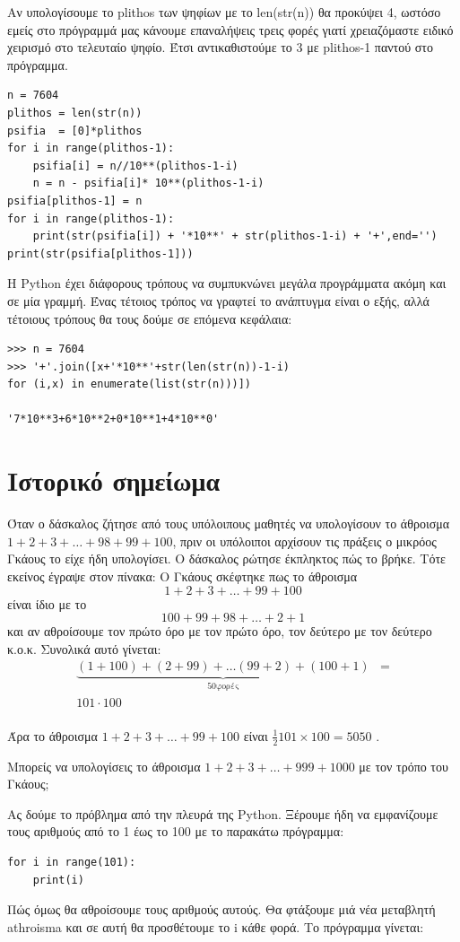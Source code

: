 Αν υπολογίσουμε το plithos των ψηφίων με το len(str(n)) θα προκύψει 4, ωστόσο εμείς στο πρόγραμμά μας κάνουμε επαναλήψεις τρεις φορές γιατί χρειαζόμαστε ειδικό χειρισμό στο τελευταίο ψηφίο. Έτσι αντικαθιστούμε το 3 με plithos-1 παντού στο πρόγραμμα.
\begin{lstlisting}
n = 7604
plithos = len(str(n))
psifia  = [0]*plithos
for i in range(plithos-1):
    psifia[i] = n//10**(plithos-1-i)
    n = n - psifia[i]* 10**(plithos-1-i)
psifia[plithos-1] = n
for i in range(plithos-1):
    print(str(psifia[i]) + '*10**' + str(plithos-1-i) + '+',end='')
print(str(psifia[plithos-1]))
\end{lstlisting}

Η Python έχει διάφορους τρόπους να συμπυκνώνει μεγάλα προγράμματα ακόμη και σε μία γραμμή. Ένας τέτοιος τρόπος να γραφτεί το ανάπτυγμα είναι ο εξής, αλλά τέτοιους τρόπους θα τους δούμε σε επόμενα κεφάλαια: 
\begin{lstlisting}
>>> n = 7604
>>> '+'.join([x+'*10**'+str(len(str(n))-1-i) 
for (i,x) in enumerate(list(str(n)))])

'7*10**3+6*10**2+0*10**1+4*10**0'
\end{lstlisting}

\section{Ιστορικό σημείωμα}

Όταν ο δάσκαλος ζήτησε από τους υπόλοιπους μαθητές να υπολογίσουν το άθροισμα $1+2+3+\ldots+98+99+100$, πριν οι υπόλοιποι αρχίσουν τις πράξεις ο μικρόος Γκάους το είχε ήδη υπολογίσει. Ο δάσκαλος ρώτησε έκπληκτος πώς το βρήκε. Τότε εκείνος έγραψε στον πίνακα:
O Γκάους σκέφτηκε πως το άθροισμα 
$$
1    +    2 + 3  + \ldots + 99 + 100
$$
είναι ίδιο με το
$$
100+  99+ 98+ \ldots +    2  + 1
$$
και αν αθροίσουμε τον πρώτο όρο με τον πρώτο όρο, τον δεύτερο με τον δεύτερο κ.ο.κ. Συνολικά αυτό γίνεται:
\begin{eqnarray}
\underbrace{(1+100) + (2+99) + \ldots  (99+2)+(100+1) }_{50 \text{φορές}} &=\\
101\cdot 100&\\
\end{eqnarray}

Άρα το άθροισμα $1 + 2 + 3+ \ldots + 99 + 100$ είναι $\frac{1}{2}101\times 100 = 5050$ .

Μπορείς να υπολογίσεις το άθροισμα $1 + 2 + 3+ \ldots + 999 + 1000$ με τον τρόπο του Γκάους;

Ας δούμε το πρόβλημα από την πλευρά της Python.
Ξέρουμε ήδη να εμφανίζουμε τους αριθμούς από το 1 έως το 100 με το παρακάτω πρόγραμμα:
\begin{lstlisting}
for i in range(101):
    print(i)
\end{lstlisting}
Πώς όμως θα αθροίσουμε τους αριθμούς αυτούς. Θα φτάξουμε μιά νέα μεταβλητή athroisma και σε αυτή θα προσθέτουμε το i κάθε φορά. Το πρόγραμμα γίνεται:

